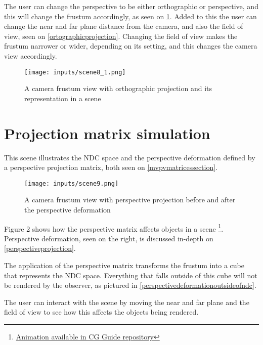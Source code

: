 \documentclass[cic,tc,english]{iiufrgs}
\begin{document}
The user can change the perspective to be either orthographic or perspective, and this will change the frustum accordingly, as seen on \cref{orthographicfrustum}. Added to this the user can change the near and far plane distance from the camera, and also the field of view, seen on \cref{ortographicprojection}. Changing the field of view makes the frustum narrower or wider, depending on its setting, and this changes the camera view accordingly.

\begin{figure}[hbt!]
    \caption{A camera frustum view with orthographic projection and its representation in a scene}
    \begin{center}
        \texttt{[image: inputs/scene8\_1.png]}
    \end{center}
    \label{orthographicfrustum}
\end{figure}

%
\section{Projection matrix simulation}
\label{projectionmatrixscene}
This scene illustrates the NDC space and the perspective deformation defined by a perspective projection matrix, both seen on \cref{mvpvmatricessection}.

\begin{figure}[hbt!]
    \caption{A camera frustum view with perspective projection before and after the perspective deformation}
    \begin{center}
        \texttt{[image: inputs/scene9.png]}
    \end{center}
    \label{perspectivedeformation}
\end{figure}

Figure \ref{perspectivedeformation} shows how the perspective matrix affects objects in a scene \footnote{\href{https://raw.githubusercontent.com/guicattani/cg-guide/master/assets/perspectiveprojection.gif}{Animation available in CG Guide repository}}. Perspective deformation, seen on the right, is discussed in-depth on \cref{perspectiveprojection}.

The application of the perspective matrix transforms the frustum into a cube that represents the NDC space. Everything that falls outside of this cube will not be rendered by the observer, as pictured in \cref{perspectivedeformationoutsideofndc}.

The user can interact with the scene by moving the near and far plane and the field of view to see how this affects the objects being rendered.
\end{document}
